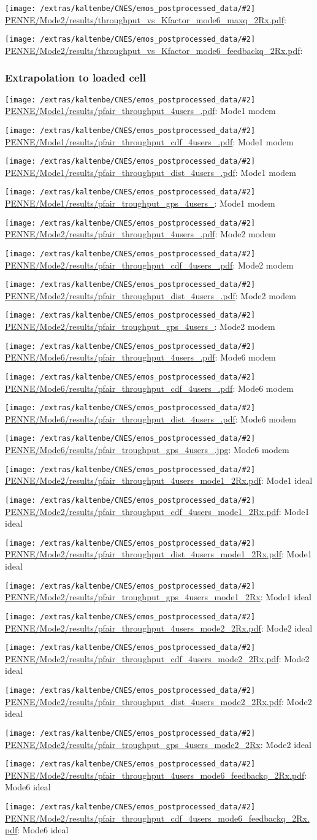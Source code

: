 \documentclass[a4paper,10pt]{article}
\newcommand{\printfile}[2][]{
 \begin{minipage}{8cm}
  \centering
  \texttt{[image: /extras/kaltenbe/CNES/emos\_postprocessed\_data/\#2]}
  \url{#2}: #1

 \end{minipage}
}
\begin{document}
\printfile{PENNE/Mode2/results/throughput_vs_Kfactor_mode6_maxq_2Rx.pdf}
\printfile{PENNE/Mode2/results/throughput_vs_Kfactor_mode6_feedbackq_2Rx.pdf}


\subsubsection{Extrapolation to loaded cell}

\printfile[Mode1 modem]{PENNE/Mode1/results/pfair_throughput_4users_.pdf}
\printfile[Mode1 modem]{PENNE/Mode1/results/pfair_throughput_cdf_4users_.pdf}

\printfile[Mode1 modem]{PENNE/Mode1/results/pfair_throughput_dist_4users_.pdf}
\printfile[Mode1 modem]{PENNE/Mode1/results/pfair_troughput_gps_4users_}

\printfile[Mode2 modem]{PENNE/Mode2/results/pfair_throughput_4users_.pdf}
\printfile[Mode2 modem]{PENNE/Mode2/results/pfair_throughput_cdf_4users_.pdf}

\printfile[Mode2 modem]{PENNE/Mode2/results/pfair_throughput_dist_4users_.pdf}
\printfile[Mode2 modem]{PENNE/Mode2/results/pfair_troughput_gps_4users_}

\printfile[Mode6 modem]{PENNE/Mode6/results/pfair_throughput_4users_.pdf}
\printfile[Mode6 modem]{PENNE/Mode6/results/pfair_throughput_cdf_4users_.pdf}

\printfile[Mode6 modem]{PENNE/Mode6/results/pfair_throughput_dist_4users_.pdf}
\printfile[Mode6 modem]{PENNE/Mode6/results/pfair_troughput_gps_4users_.jpg}

\printfile[Mode1 ideal]{PENNE/Mode2/results/pfair_throughput_4users_mode1_2Rx.pdf}
\printfile[Mode1 ideal]{PENNE/Mode2/results/pfair_throughput_cdf_4users_mode1_2Rx.pdf}

\printfile[Mode1 ideal]{PENNE/Mode2/results/pfair_throughput_dist_4users_mode1_2Rx.pdf}
\printfile[Mode1 ideal]{PENNE/Mode2/results/pfair_troughput_gps_4users_mode1_2Rx}

\printfile[Mode2 ideal]{PENNE/Mode2/results/pfair_throughput_4users_mode2_2Rx.pdf}
\printfile[Mode2 ideal]{PENNE/Mode2/results/pfair_throughput_cdf_4users_mode2_2Rx.pdf}

\printfile[Mode2 ideal]{PENNE/Mode2/results/pfair_throughput_dist_4users_mode2_2Rx.pdf}
\printfile[Mode2 ideal]{PENNE/Mode2/results/pfair_troughput_gps_4users_mode2_2Rx}

\printfile[Mode6 ideal]{PENNE/Mode2/results/pfair_throughput_4users_mode6_feedbackq_2Rx.pdf}
\printfile[Mode6 ideal]{PENNE/Mode2/results/pfair_throughput_cdf_4users_mode6_feedbackq_2Rx.pdf}
\end{document}
